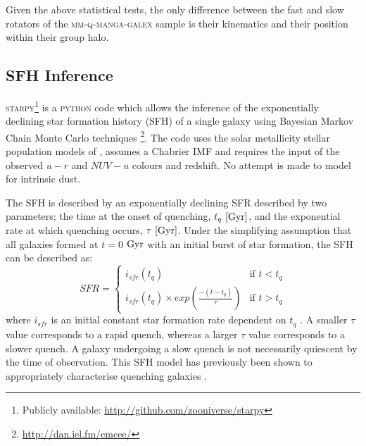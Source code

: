 \documentclass[useAMS,usenatbib]{mn2e}
\begin{document}
Given the above statistical tests, the only difference between the fast and slow rotators of the \textsc{mm-q-manga-galex} sample is their kinematics and their position within their group halo.


\subsection{SFH Inference}\label{sec:starpy}

\textsc{starpy}\footnote{Publicly available: \url{http://github.com/zooniverse/starpy}} is a \textsc{python} code which allows the inference of the exponentially declining star formation history (SFH) of a single galaxy using  Bayesian Markov Chain Monte Carlo techniques \citep{emcee13}\footnote{\url{http://dan.iel.fm/emcee/}}. The code uses the solar metallicity stellar population models of \cite[][hereafter BC03]{BC03}, assumes a Chabrier IMF \citep{chabrier03} and requires the input of the observed $u-r$ and $NUV-u$ colours and redshift. No attempt is made to model for intrinsic dust. 

The SFH is described by an exponentially declining SFR described by two parameters; the time at the onset of quenching, $t_q~\rm{[Gyr]}$, and the exponential rate at which quenching occurs, $\tau~\rm{[Gyr]}$. Under the simplifying assumption that all galaxies formed at $t=0$ $\rm{ Gyr}$ with an initial burst of star formation, the SFH can be described as:
\begin{equation}\label{sfh}
SFR =
\begin{cases}
i_{sfr}(t_q) & \text{if } t < t_q \\
i_{sfr}(t_q) \times exp{\left( \frac{-(t-t_{q})}{\tau}\right)} & \text{if } t > t_q 
\end{cases}
\end{equation}
where $i_{sfr}$ is an initial constant star formation rate dependent on $t_q$ \citep{schawinski14, smethurst15}.  A smaller $\tau$ value corresponds to a rapid quench, whereas a larger $\tau$ value corresponds to a slower quench. A galaxy undergoing a slow quench is not necessarily quiescent by the time of observation. This SFH model has previously been shown to appropriately characterise quenching galaxies \citep{Weiner06, Martin07, Noeske07,schawinski14}. 
\end{document}
